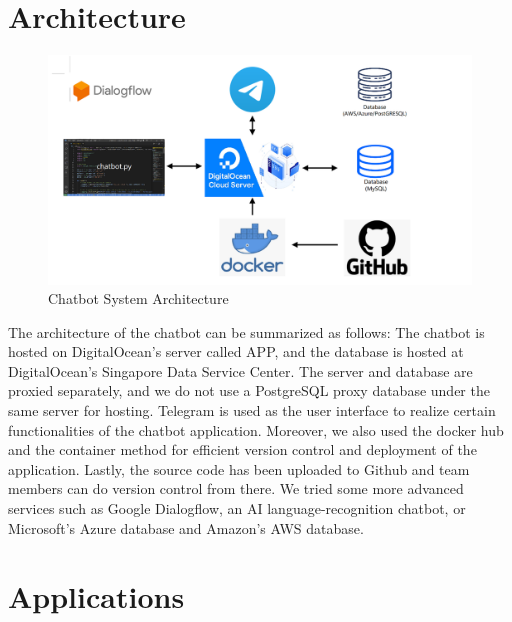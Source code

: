 \documentclass[conference]{IEEEtran}
\begin{document}
\section{Architecture}
\begin{figure}[h]
\includegraphics[scale=0.18]{1} 
\caption{Chatbot System Architecture}
\end{figure}
The architecture of the chatbot can be summarized as follows: The chatbot is hosted on DigitalOcean's server called APP, and the database is hosted at DigitalOcean's Singapore Data Service Center. The server and database are proxied separately, and we do not use a PostgreSQL proxy database under the same server for hosting. Telegram is used as the user interface to realize certain functionalities of the chatbot application. Moreover, we also used the docker hub and the container method for efficient version control and deployment of the application. Lastly, the source code has been uploaded to Github and team members can do version control from there.
We tried some more advanced services such as Google Dialogflow, an AI language-recognition chatbot, or Microsoft's Azure database and Amazon's AWS database.
\section{Applications}
\end{document}
